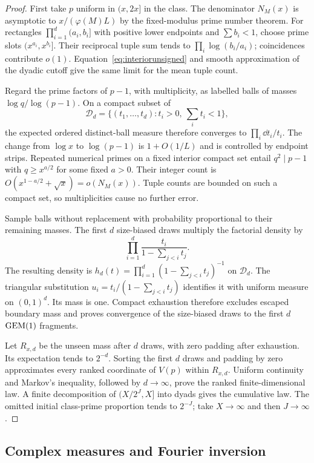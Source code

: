 \begin{proof}
First take $p$ uniform in $(x,2x]$ in the class. The denominator
$N_M(x)$ is asymptotic to $x/(\varphi(M)L)$ by the fixed-modulus
prime number theorem. For rectangles $\prod_{i=1}^d(a_i,b_i]$ with
positive lower endpoints and $\sum b_i<1$, choose prime slots
$(x^{a_i},x^{b_i}]$. Their reciprocal tuple sum tends to
$\prod_i\log(b_i/a_i)$; coincidences contribute $o(1)$.
Equation~\eqref{eq:interiorunsigned} and smooth approximation of
the dyadic cutoff give the same limit for the mean tuple count.

Regard the prime factors of $p-1$, with multiplicity, as labelled
balls of masses $\log q/\log(p-1)$. On a compact subset of
\[
 \mathcal D_d=\{(t_1,\ldots,t_d):t_i>0,\ \sum_i t_i<1\},
\]
the expected ordered distinct-ball measure therefore converges to
$\prod_i\dd t_i/t_i$. The change from $\log x$ to $\log(p-1)$
is $1+O(1/L)$ and is controlled by endpoint strips. Repeated
numerical primes on a fixed interior compact set entail
$q^2\mid p-1$ with $q\geq x^{a/2}$ for some fixed $a>0$.
Their integer count is
$O(x^{1-a/2}+\sqrt{x})=o(N_M(x))$. Tuple counts are bounded on
such a compact set, so multiplicities cause no further error.

Sample balls without replacement with probability proportional to
their remaining masses. The first $d$ size-biased draws multiply
the factorial density by
\[
 \prod_{i=1}^d\frac{t_i}{1-\sum_{j<i}t_j}.
\]
The resulting density is
$h_d(t)=\prod_{i=1}^d(1-\sum_{j<i}t_j)^{-1}$ on $\mathcal D_d$.
The triangular substitution
$u_i=t_i/(1-\sum_{j<i}t_j)$ identifies it with uniform measure
on $(0,1)^d$. Its mass is one. Compact exhaustion therefore excludes
escaped boundary mass and proves convergence of the size-biased
draws to the first $d$ $\operatorname{GEM}(1)$ fragments.

Let $R_{x,d}$ be the unseen mass after $d$ draws, with zero padding
after exhaustion. Its expectation tends to $2^{-d}$.
Sorting the first $d$ draws and padding by zero approximates every
ranked coordinate of $V(p)$ within $R_{x,d}$.
Uniform continuity and Markov's inequality, followed by $d\to\infty$,
prove the ranked finite-dimensional law.
A finite decomposition of $(X/2^J,X]$ into dyads gives the cumulative
law. The omitted initial class-prime proportion tends to $2^{-J}$;
take $X\to\infty$ and then $J\to\infty$.
\end{proof}

\subsection{Complex measures and Fourier inversion}

